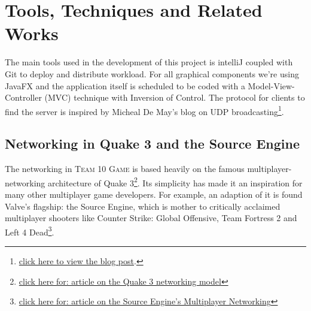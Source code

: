 \section{Tools, Techniques and Related Works} 
% 
% 
% 
% 
% 
% 
% 
The main tools used in the development of this project is intelliJ coupled with Git to deploy and distribute workload. For all graphical components we're using JavaFX and the application itself is scheduled to be coded with a Model-View-Controller (MVC) technique with Inversion of Control. The protocol for clients to find the server is inspired by Micheal De May's blog on UDP broadcasting\footnote{\href{https://michieldemey.be/blog/network-discovery-using-udp-broadcast/}{click here to view the blog post}.}.

\subsection{Networking in Quake 3 and the Source Engine} \label{quake3source}
The networking in \textsc{Team 10 Game} is based heavily on the famous multiplayer-networking architecture of Quake 3\footnote{\href{http://fabiensanglard.net/quake3/network.php}{click here for: article on the Quake 3 networking model}}. Its simplicity has made it an inspiration for many other multiplayer game developers. For example, an adaption of it is found Valve's flagship: the Source Engine, which is mother to critically acclaimed multiplayer shooters like Counter Strike: Global Offensive, Team Fortress 2 and Left 4 Dead\footnote{\href{https://developer.valvesoftware.com/wiki/Source_Multiplayer_Networking}{click here for: article on the Source Engine's Multiplayer Networking}}. 

